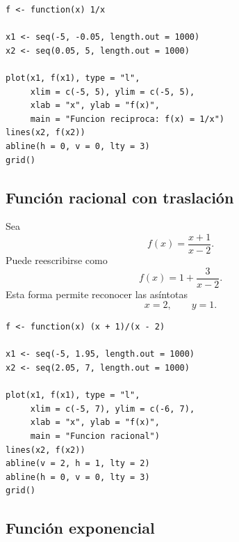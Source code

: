 \documentclass[12pt]{article}
\theoremstyle{remark}
\begin{document}
\begin{verbatim}
f <- function(x) 1/x

x1 <- seq(-5, -0.05, length.out = 1000)
x2 <- seq(0.05, 5, length.out = 1000)

plot(x1, f(x1), type = "l",
     xlim = c(-5, 5), ylim = c(-5, 5),
     xlab = "x", ylab = "f(x)",
     main = "Funcion reciproca: f(x) = 1/x")
lines(x2, f(x2))
abline(h = 0, v = 0, lty = 3)
grid()
\end{verbatim}

\subsection*{Función racional con traslación}

Sea
\[
f(x)=\frac{x+1}{x-2}.
\]
Puede reescribirse como
\[
f(x)=1+\frac{3}{x-2}.
\]
Esta forma permite reconocer las asíntotas
\[
x=2,\qquad y=1.
\]

\begin{center}
\end{center}

\begin{verbatim}
f <- function(x) (x + 1)/(x - 2)

x1 <- seq(-5, 1.95, length.out = 1000)
x2 <- seq(2.05, 7, length.out = 1000)

plot(x1, f(x1), type = "l",
     xlim = c(-5, 7), ylim = c(-6, 7),
     xlab = "x", ylab = "f(x)",
     main = "Funcion racional")
lines(x2, f(x2))
abline(v = 2, h = 1, lty = 2)
abline(h = 0, v = 0, lty = 3)
grid()
\end{verbatim}

\subsection*{Función exponencial}
\end{document}
